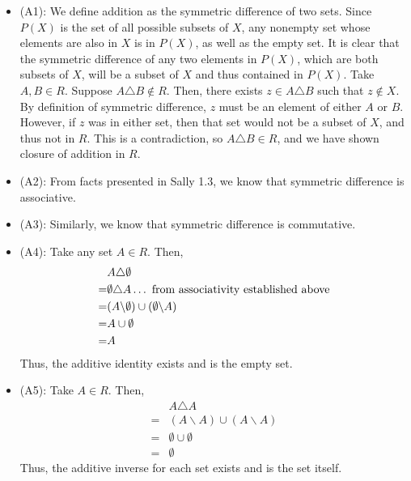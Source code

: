 \documentclass[
]{article}
\begin{document}
\begin{itemize} 
\item (A1): We define addition as the symmetric difference of two sets. Since $P(X)$ is the set of all possible subsets of $X$, any nonempty set whose elements are also in $X$ is in $P(X)$, as well as the empty set. It is clear that the symmetric difference of any two elements in $P(X)$, which are both subsets of $X$, will be a subset of $X$ and thus contained in $P(X)$.  
Take $A, B \in R$. Suppose $A \triangle B \notin R$. Then, there exists $z \in A \triangle B$ such that $z \notin X$. By definition of symmetric difference, $z$ must be an element of either $A$ or $B$. However, if $z$ was in either set, then that set would not be a subset of $X$, and thus not in $R$. This is a contradiction, so $A \triangle B \in R$, and we have shown closure of addition in $R$. 
\item (A2): From facts presented in Sally 1.3, we know that symmetric difference is associative. 
\item (A3): Similarly, we know that symmetric difference is commutative. 
\item (A4): Take any set $A \in R$. Then, \[\begin{aligned} &A \triangle \emptyset \\ = &\emptyset \triangle A \space \dots \text{ from associativity established above}\\ = &(A\backslash \emptyset) \cup (\emptyset \backslash A) \\ = & A \cup \emptyset \\ =& A \end{aligned} \]
Thus, the additive identity exists and is the empty set. 
\item (A5): Take $A \in R$. Then, 
\[\begin{aligned} & A \triangle A \\ = &(A\backslash A) \cup (A \backslash A) \\ = & \emptyset \cup \emptyset \\ =& \emptyset \end{aligned}\]
Thus, the additive inverse for each set exists and is the set itself.
  


\end{itemize}
\end{document}

